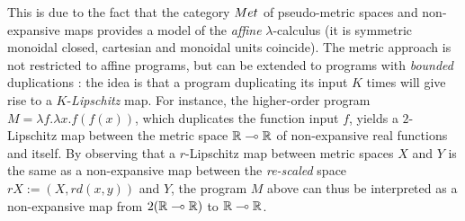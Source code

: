 This is due to the fact that the category $\Met$ of pseudo-metric spaces and non-expansive maps provides a model of the %
\emph{affine} $\lambda$-calculus (it is symmetric monoidal closed, cartesian and monoidal units coincide). 
The metric approach is not restricted to affine programs, but can be extended to programs with \emph{bounded} duplications \cite{Reed2010, Gaboardi2017}: the idea is that a program duplicating its input $K$ times will give rise to a $K$-\emph{Lipschitz} map.
For instance, the higher-order program $M=\lambda f.\lambda x.f(f(x))$, which duplicates the function input $f$, yields a $2$-Lipschitz map between the metric space $\mathbb{R}\multimap \mathbb{R}$ of non-expansive real functions and itself. %
By observing that a $r$-Lipschitz map between metric spaces $X$ and $Y$ is the same as a non-expansive map between the \emph{re-scaled} space $rX:=(X,%
rd(x,y))$ and $Y$, the program $M$ above 
can thus be interpreted as a non-expansive map from $2(\mathbb{R}\multimap \mathbb{R})$ to $\mathbb{R}\multimap \mathbb{R}$.

